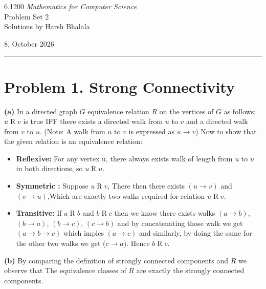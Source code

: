 \documentclass{article}
\begin{document}
\noindent
\begin{minipage}[t]{0.68\textwidth}
{\large 6.1200 \textit{Mathematics for Computer Science}}\\[4pt]
{\large Problem Set 2}\\[4pt]
{\large Solutions by Harsh Bhalala}
\end{minipage}%
\hfill
\begin{minipage}[t]{0.27\textwidth}
\raggedleft
{\large 8, October 2026}
\end{minipage}

\vspace{6pt}

\noindent\rule{\textwidth}{0.5pt}

\section*{Problem 1. Strong Connectivity}

\textbf{(a)} In a directed graph $G$ equivalence relation $R$ on the vertices of $G$ as follows: $u \mathrel{R} v$
is true IFF there exists a directed walk from $u$ to $v$ and a directed walk from $v$ to $u$.
(Note: A walk from $ u$ to $ v$ is expressed as $u \rightarrow v$)
Now to show that the given relation is an equivalence relation:
\begin{itemize}
\item \textbf{Reflexive:} For any vertex u, there always exists walk of length from $u$ to $u$ in both directions, so $u \mathrel{R} u$.
\item \textbf{Symmetric :} Suppose $u \mathrel{R} v$, There then there exists $(u \rightarrow v)$ and $(v \rightarrow u)$,Which are exactly two
walks required for relation $u \mathrel{R} v$.
\item \textbf{Transitive:} If $a \mathrel{R} b$ and $b \mathrel{R} c$ then we know there exists walks $(a \rightarrow b)$, $(b \rightarrow a)$,
$(b \rightarrow c)$, $(c \rightarrow b)$ and by concatenating those walk we get $(a \rightarrow b \rightarrow c)$ which imples $(a \rightarrow c)$
and similarly, by doing the same for the other two walks we get ($c \rightarrow a$). Hence $b \mathrel{R} c$.
\end{itemize}

\vspace{\baselineskip}
\noindent\textbf{(b)}
By comparing the definition of strongly connected components and $R$ we observe that The equivalence classes of $R$ are exactly the strongly connected components.
\end{document}
